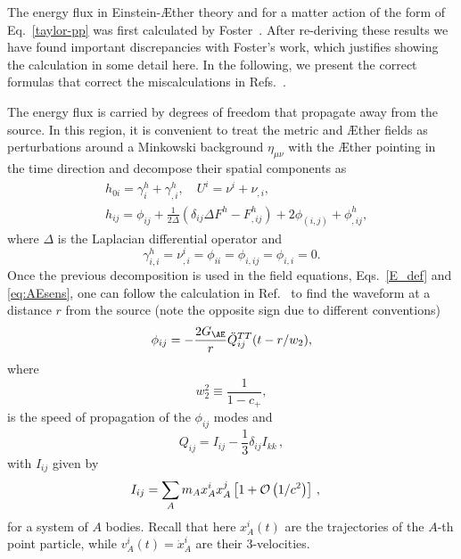 \documentclass[prd,aps,twocolumn,nofootinbib,showpacs,superscriptaddress]{revtex4-1}
\newcommand\be{\begin{equation}}
\newcommand\ee{\end{equation}}
\def\m{\mu}
\begin{document}
The energy flux in Einstein-\AE ther theory and for a matter action of the form of Eq.~\eqref{taylor-pp} was first calculated by Foster~\cite{Foster:2007gr}. After re-deriving these results we have found important discrepancies with Foster's work, which justifies showing the calculation in some detail here. 
In the following, we present the correct formulas that correct the miscalculations in Refs.~\cite{Foster:2007gr}.

The energy flux is carried by degrees of freedom that propagate away from the source. In this region, it is convenient to treat the metric
and \AE ther fields as perturbations around a Minkowski background $\eta_{\m\nu}$ with the \AE ther pointing in the time direction and decompose
their spatial components as 
\be
\label{eq:metric_dec}
\begin{split}
&h_{0i}=\gamma^h_i+\gamma^h_{,i}, \quad U^i=\nu^i+\nu_{,i},\\
&h_{ij}=\phi_{ij}+\frac{1}{2\Delta}\left(\delta_{ij}\Delta F^h-F^h_{,ij}\right)+2\phi_{(i,j)}+\phi^h_{,ij},
\end{split}
\ee
where $\Delta$ is the Laplacian differential operator and
\be
\gamma^h_{i,i}=\nu^i_{,i}=\phi_{ii}=\phi_{i,ij}=\phi_{i,i}=0.
\ee
Once the previous decomposition is used in the field equations, Eqs.~\eqref{E_def} and \eqref{eq:AEsens}, one can follow the calculation in 
Ref.~\cite{Foster:2007gr} to find 
the waveform at a distance $r$ from the source (note the opposite sign due to different conventions)
\be
\phi_{ij}=-\frac{2 G_{\AE}}{r} \ddot Q_{ij}^{TT}(t-r/w_2), 
\ee
where 
\be
\label{w2-def}
w_2^2 \equiv \frac{1}{1-c_{+}}, 
\ee
is the speed of propagation of the $\phi_{ij}$ modes and
\be
\label{Q-mom}
Q_{ij} =I_{ij}-\frac{1}{3} \delta_{ij} I_{kk}\,, 
\ee
with $I_{ij}$ given by 
\begin{align}
\label{I-mom}
I_{ij} &= \sum_{A}  m_A x^i_A x^j_A  \left[1+{\cal{O}}\left({1}/{c^{2}}\right)\right]\,,
\end{align}
for a system of $A$ bodies. Recall that here $x_{A}^{i}(t)$ are the trajectories of the $A$-th point
particle, while $v_{A}^{i}(t) = \dot{x}_{A}^{i}$ are their  3-velocities.
\end{document}
